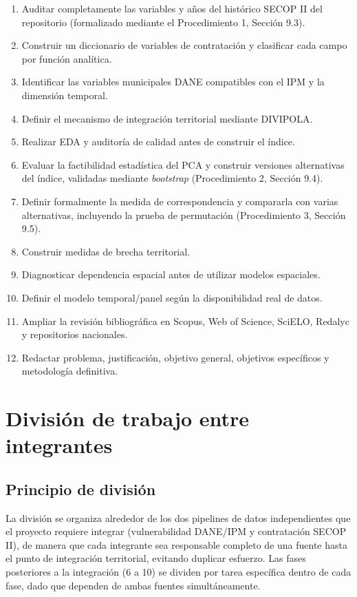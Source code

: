 \documentclass[11pt,letterpaper]{article}
\begin{document}
\begin{enumerate}
\item Auditar completamente las variables y años del histórico SECOP II del
repositorio (formalizado mediante el Procedimiento 1, Sección 9.3).
\item Construir un diccionario de variables de contratación y clasificar cada
campo por función analítica.
\item Identificar las variables municipales DANE compatibles con el IPM y la
dimensión temporal.
\item Definir el mecanismo de integración territorial mediante DIVIPOLA.
\item Realizar EDA y auditoría de calidad antes de construir el índice.
\item Evaluar la factibilidad estadística del PCA y construir versiones
alternativas del índice, validadas mediante \textit{bootstrap} (Procedimiento
2, Sección 9.4).
\item Definir formalmente la medida de correspondencia y compararla con varias
alternativas, incluyendo la prueba de permutación (Procedimiento 3, Sección
9.5).
\item Construir medidas de brecha territorial.
\item Diagnosticar dependencia espacial antes de utilizar modelos espaciales.
\item Definir el modelo temporal/panel según la disponibilidad real de datos.
\item Ampliar la revisión bibliográfica en Scopus, Web of Science, SciELO,
Redalyc y repositorios nacionales.
\item Redactar problema, justificación, objetivo general, objetivos
específicos y metodología definitiva.
\end{enumerate}

\section{División de trabajo entre integrantes}

\subsection{Principio de división}

La división se organiza alrededor de los dos pipelines de datos independientes
que el proyecto requiere integrar (vulnerabilidad DANE/IPM y contratación
SECOP II), de manera que cada integrante sea responsable completo de una
fuente hasta el punto de integración territorial, evitando duplicar esfuerzo.
Las fases posteriores a la integración (6 a 10) se dividen por tarea
específica dentro de cada fase, dado que dependen de ambas fuentes
simultáneamente.
\end{document}
